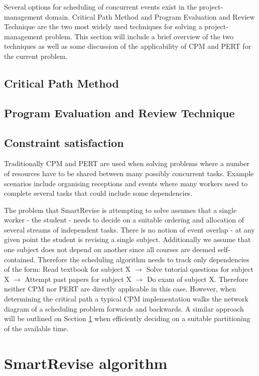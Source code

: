 \documentclass[bsc,frontabs,twoside,singlespacing,parskip]{infthesis}     %
\begin{document}
		Several options for scheduling of concurrent events exist in the project-management domain. Critical Path Method and Program Evaluation and Review Technique are the two most widely used techniques for solving a project-management problem. This section will include a brief overview of the two techniques as well as some discussion of the applicability of CPM and PERT for the current problem.

			\subsection{Critical Path Method}

			\subsection{Program Evaluation and Review Technique}

			\subsection{Constraint satisfaction}

		Traditionally CPM and PERT are used when solving problems where a number of resources have to be shared between many possibly concurrent tasks. Example scenarios include organising receptions and events where many workers need to complete several tasks that could include some dependencies.

		The problem that SmartRevise is attempting to solve assumes that a single worker - the student - needs to decide on a suitable ordering and allocation of several streams of independent tasks. There is no notion of event overlap - at any given point the student is revising a single subject. Additionally we assume that one subject does not depend on another since all courses are deemed self-contained. Therefore the scheduling algorithm needs to track only dependencies of the form: Read textbook for subject X $\rightarrow$ Solve tutorial questions for subject X $\rightarrow$ Attempt past papers for subject X $\rightarrow$ Do exam of subject X. Therefore neither CPM nor PERT are directly applicable in this case. However, when determining the critical path a typical CPM implementation walks the network diagram of a scheduling problem forwards and backwards. A similar approach will be outlined on Section \ref{algo} when efficiently deciding on a suitable partitioning of the available time.



	\section{SmartRevise algorithm}\label{algo}
\end{document}
